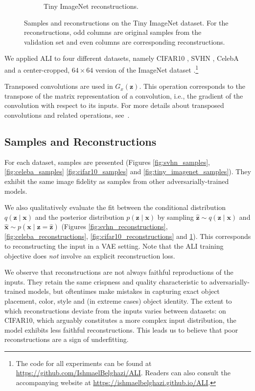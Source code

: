 \documentclass{article}
\begin{document}
\begin{figure}[t]
\begin{subfigure}[t]{0.49\textwidth}
        \caption{\label{fig:tiny_imagenet_reconstructions} Tiny ImageNet
            reconstructions.}
    \end{subfigure}
    \caption{\label{fig:tiny_imagenet_images} Samples and reconstructions on the
        Tiny ImageNet dataset. For the reconstructions, odd columns are original
        samples from the validation set and even columns are corresponding
        reconstructions.}
\end{figure}

We applied ALI to four different datasets, namely CIFAR10
\citep{krizhevsky2009learning}, SVHN \citep{netzer2011reading}, CelebA
\citep{liu2015deep} and a center-cropped, $64 \times 64$ version of the ImageNet
dataset \citep{russakovsky2015imagenet}.\footnote{
    The code for all experiments can be found at
    \url{https://github.com/IshmaelBelghazi/ALI}. Readers can also consult the
    accompanying website at \url{https://ishmaelbelghazi.github.io/ALI}.}

Transposed convolutions are used in $G_x(\bm{z})$. This operation corresponds
to the transpose of the matrix representation of a convolution, i.e., the
gradient of the convolution with respect to its inputs. For more details about
transposed convolutions and related operations,
see~\citet{dumoulin2016guide,shi2016deconvolution,odena2016deconvolution}.

\subsection{Samples and Reconstructions}
For each dataset, samples are presented (Figures \ref{fig:svhn_samples},
\ref{fig:celeba_samples} \ref{fig:cifar10_samples} and
\ref{fig:tiny_imagenet_samples}). They exhibit the same image fidelity as
samples from other adversarially-trained models.

We also qualitatively evaluate the fit between the conditional distribution
$q(\bm{z} \mid \bm{x})$ and the posterior distribution $p(\bm{z} \mid \bm{x})$
by sampling $\hat{\bm{z}} \sim q(\bm{z} \mid \bm{x})$ and $\hat{\bm{x}} \sim
p(\bm{x} \mid \bm{z} = \hat{\bm{z}})$ (Figures \ref{fig:svhn_reconstructions},
\ref{fig:celeba_reconstructions}, \ref{fig:cifar10_reconstructions} and
\ref{fig:tiny_imagenet_reconstructions}). This corresponds to reconstructing the
input in a VAE setting. Note that the ALI training objective does {\em not}
involve an explicit reconstruction loss.

We observe that reconstructions are not always faithful reproductions of the
inputs.  They retain the same crispness and quality characteristic to
adversarially-trained models, but oftentimes make mistakes in capturing exact
object placement, color, style and (in extreme cases) object identity. The
extent to which reconstructions deviate from the inputs varies between datasets:
on CIFAR10, which arguably constitutes a more complex input distribution, the
model exhibits less faithful reconstructions. This leads us to believe that poor
reconstructions are a sign of underfitting.
\end{document}

